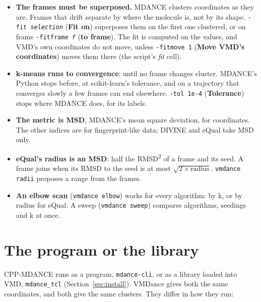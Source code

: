 \documentclass[11pt,letterpaper]{article}
\newcommand{\ui}[1]{\textsf{\textbf{#1}}}
\newcommand{\cmd}[1]{\texttt{#1}}
\newcommand{\meta}[1]{\textrm{\emph{#1}}}
\begin{document}
\begin{itemize}
  \item \textbf{The frames must be superposed.} MDANCE clusters coordinates as
    they are. Frames that drift separate by where the molecule is, not by its
    shape. \cmd{-fit \meta{selection}} (\ui{Fit on}) superposes them on the
    first one clustered, or on frame \cmd{-fitframe \meta{f}} (\ui{to frame}).
    The fit is computed on the values, and VMD's own coordinates do not move,
    unless \cmd{-fitmove 1} (\ui{Move VMD's coordinates}) moves them there
    (the script's \emph{fit} cell).
  \item \textbf{k-means runs to convergence}: until no frame changes cluster.
    MDANCE's Python stops before, at scikit-learn's tolerance, and on a
    trajectory that converges slowly a few frames can end elsewhere.
    \cmd{-tol 1e-4} (\ui{Tolerance}) stops where MDANCE does, for its labels.
  \item \textbf{The metric is MSD}, MDANCE's mean square deviation, for
    coordinates. The other indices are for fingerprint-like data; DIVINE and
    eQual take MSD only.
  \item \textbf{eQual's radius is an MSD}: half the RMSD\textsuperscript{2} of a
    frame and its seed. A frame joins when its RMSD to the seed is at most
    $\sqrt{2 \times \text{radius}}$. \cmd{vmdance radii} proposes a range from
    the frames.
  \item \textbf{An elbow scan} (\cmd{vmdance elbow}) works for every algorithm:
    by k, or by radius for eQual. A sweep (\cmd{vmdance sweep}) compares
    algorithms, seedings and k at once.
\end{itemize}

\section{The program or the library}
\label{sec:bench}

CPP-MDANCE runs as a program, \cmd{mdance-cli}, or as a library loaded into
VMD, \cmd{mdance\_tcl} (Section~\ref{sec:install}). VMDance gives both the
same coordinates, and both give the same clusters. They differ in how they
run:
\end{document}
